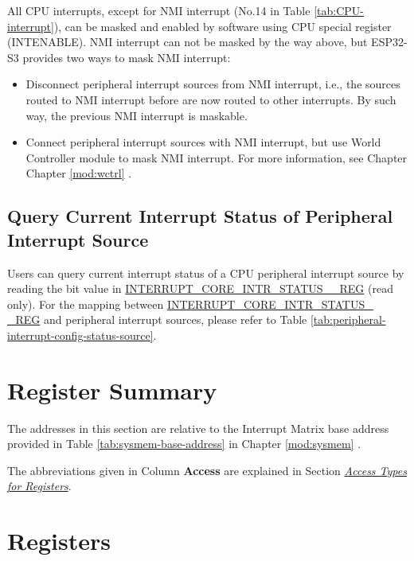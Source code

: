 \documentclass[main\_\_EN.tex]{subfiles}
\begin{document}
All CPU interrupts, except for NMI interrupt (No.14 in Table \ref{tab:CPU-interrupt}), can be masked and enabled by software using CPU special register (INTENABLE). NMI interrupt can not be masked by the way above, but ESP32-S3 provides two ways to mask NMI interrupt:
\begin{itemize}
    \item Disconnect peripheral interrupt sources from NMI interrupt, i.e., the sources routed to NMI interrupt before are now routed to other interrupts. By such way, the previous NMI interrupt is maskable.
    \item Connect peripheral interrupt sources with NMI interrupt, but use World Controller module to mask NMI interrupt. For more information, see Chapter Chapter \ref{mod:wctrl} \textit{}.
\end{itemize}


\subsection{Query Current Interrupt Status of Peripheral Interrupt Source}

Users can query current interrupt status of a CPU peripheral interrupt source by reading the bit value in \hyperref[regdesc:INTERRUPTCORE0INTRSTATUS0REG]{INTERRUPT\_CORE\_INTR\_STATUS\_\_REG} (read only). For the mapping between \hyperref[regdesc:INTERRUPTCORE0INTRSTATUS0REG]{INTERRUPT\_CORE\_INTR\_STATUS\_\\\_REG} and peripheral interrupt sources, please refer to Table \ref{tab:peripheral-interrupt-config-status-source}.

\hypertarget{intmtrx-reg-summ}{}
\section{Register Summary}
The addresses in this section are relative to the Interrupt Matrix base address provided in Table \ref{tab:sysmem-base-address} in Chapter \ref{mod:sysmem} \textit{}.

The abbreviations given in Column \textbf{Access} are explained in Section \hyperref[glossary-access-types]{\textit{Access Types for Registers}}.




\section{Registers}

\end{document}
